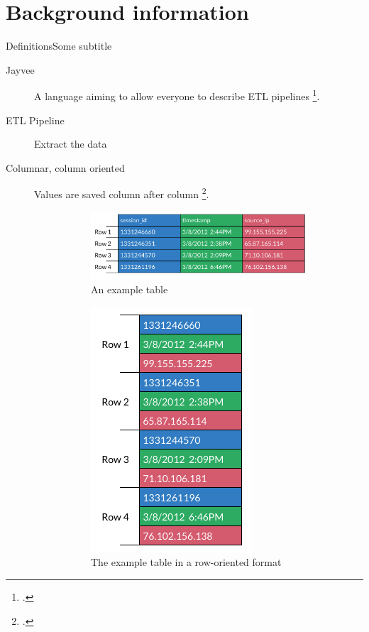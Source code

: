 \section{Background information} %
\begin{frame}[t]{Definitions}{Some subtitle} %
	\begin{description}
		\item[Jayvee] A language aiming to allow everyone to describe ETL pipelines \footcite{jvalue:jayvee}.
		\item[ETL Pipeline] Extract the data
		\item[Columnar, column oriented] Values are saved column after column \footcite{Floratou2019}.
		      \begin{figure}
			      \begin{subfigure}{0.45\linewidth}
				      \includegraphics[width=0.9\linewidth]{assets/table-example.png}
				      \caption{An example table}
			      \end{subfigure}
			      \begin{subfigure}{0.22\linewidth}
				      \includegraphics[height=0.3\FrameHeight]{assets/table-row.png}
				      \caption{The example table in a row-oriented format}
			      \end{subfigure}
			      \begin{subfigure}{0.22\linewidth}

\end{subfigure}
\end{figure}
\end{description}
\end{frame}
